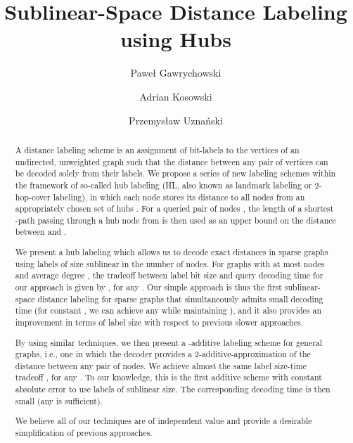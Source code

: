 \documentclass{article}[11pt,letter]
\begin{document}
\author[1]{Pawe\l{} Gawrychowski}
\author[2]{Adrian Kosowski}
\author[3]{Przemys\l{}aw Uznański}


\date{}

\title{Sublinear-Space Distance Labeling using Hubs}

\maketitle

\begin{abstract}
A distance labeling scheme is an assignment of bit-labels to the vertices of an undirected, unweighted graph such that the distance between any pair of vertices can be decoded solely from their labels. We propose a series of new labeling schemes within the framework of so-called hub labeling (HL, also known as landmark labeling or 2-hop-cover labeling), in which each node  stores its distance to all nodes from an appropriately chosen set of hubs . For a queried pair of nodes , the length of a shortest -path passing through a hub node from  is then used as an upper bound on the distance between  and .

We present a hub labeling which allows us to decode exact distances in sparse graphs using labels of size sublinear in the number of nodes.  For graphs with at most  nodes and average degree , the tradeoff between label bit size  and query decoding time  for our approach is given by , for any . Our simple approach is thus the first sublinear-space distance labeling for sparse graphs that simultaneously admits small decoding time (for constant , we can achieve any  while maintaining ), and it also provides an improvement in terms of label size with respect to previous slower approaches.

By using similar techniques, we then present a -additive labeling scheme for general graphs, i.e., one in which the decoder provides a 2-additive-approximation of the distance between any pair of nodes. We achieve almost the same label size-time tradeoff , for any . To our knowledge, this is the first additive scheme with constant absolute error to use labels of sublinear size. The corresponding decoding time is then small (any  is sufficient).

We believe all of our techniques are of independent value and provide a desirable simplification of previous approaches.
\end{abstract}
\end{document}
